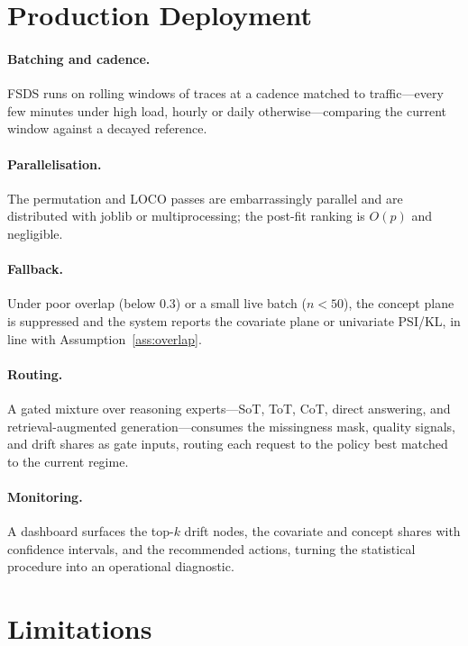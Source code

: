 \documentclass[11pt]{article}
\begin{document}
\section{Production Deployment}
\label{sec:deployment}

\paragraph{Batching and cadence.} FSDS runs on rolling windows of traces at a
cadence matched to traffic---every few minutes under high load, hourly or daily
otherwise---comparing the current window against a decayed reference.

\paragraph{Parallelisation.} The permutation and LOCO passes are embarrassingly
parallel and are distributed with joblib or multiprocessing; the post-fit ranking
is $O(p)$ and negligible.

\paragraph{Fallback.} Under poor overlap (below $0.3$) or a small live batch
($n<50$), the concept plane is suppressed and the system reports the covariate
plane or univariate PSI/KL, in line with Assumption~\ref{ass:overlap}.

\paragraph{Routing.} A gated mixture over reasoning experts---SoT, ToT, CoT,
direct answering, and retrieval-augmented generation---consumes the missingness
mask, quality signals, and drift shares as gate inputs, routing each request to
the policy best matched to the current regime.

\paragraph{Monitoring.} A dashboard surfaces the top-$k$ drift nodes, the
covariate and concept shares with confidence intervals, and the recommended
actions, turning the statistical procedure into an operational diagnostic.

\section{Limitations}
\label{sec:limitations}
\end{document}
